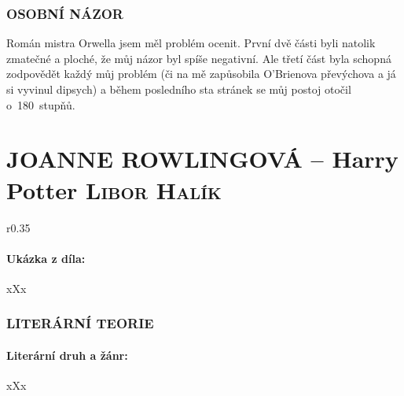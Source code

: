 \documentclass[A4paper]{extarticle} %
\begin{document}
\section*{OSOBNÍ NÁZOR}
\noindent 
Román mistra Orwella jsem měl problém ocenit. První dvě části byli natolik zmatečné a ploché, že můj názor byl spíše negativní. Ale třetí část byla schopná zodpovědět každý můj problém (či na mě zapůsobila O’Brienova převýchova a já si vyvinul dipsych) a během posledního sta stránek se můj postoj otočil o~180~stupňů.



\vfill


\newpage


\changefontsize{8pt}

\part*{JOANNE ROWLINGOVÁ -- Harry Potter {\hfill \normalfont\tiny\textsc{Libor Halík}}}

\noindent\begin{wrapfigure}{r}{0.35\textwidth}
\tiny

\subsection*{Ukázka z díla:}
\setlength{\parindent}{3pt}
xXx
\end{wrapfigure}

\section*{LITERÁRNÍ TEORIE}

\subsection*{Literární druh a žánr:}
\noindent xXx


\end{document}
